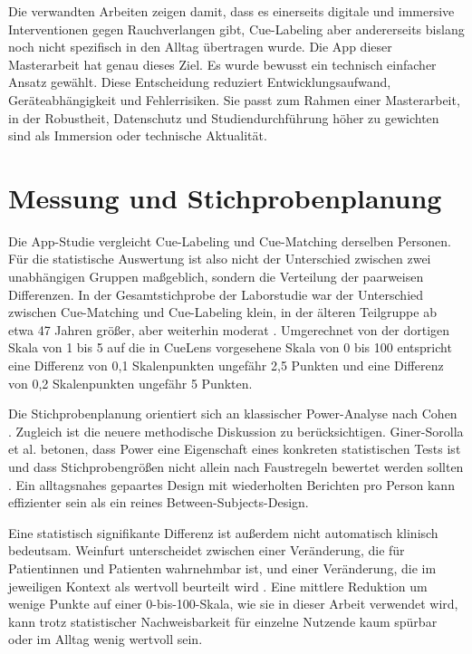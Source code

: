 Die verwandten Arbeiten zeigen damit, dass es einerseits digitale und immersive Interventionen gegen Rauchverlangen gibt, Cue-Labeling aber andererseits bislang noch nicht spezifisch in den Alltag übertragen wurde. Die App dieser Masterarbeit hat genau dieses Ziel. Es wurde bewusst ein technisch einfacher Ansatz gewählt. Diese Entscheidung reduziert Entwicklungsaufwand, Geräteabhängigkeit und Fehlerrisiken. Sie passt zum Rahmen einer Masterarbeit, in der Robustheit, Datenschutz und Studiendurchführung höher zu gewichten sind als Immersion oder technische Aktualität. \\

\section{Messung und Stichprobenplanung}

Die App-Studie vergleicht Cue-Labeling und Cue-Matching derselben Personen. Für die statistische Auswertung ist also nicht der Unterschied zwischen zwei unabhängigen Gruppen maßgeblich, sondern die Verteilung der paarweisen Differenzen. In der Gesamtstichprobe der Laborstudie war der Unterschied zwischen Cue-Matching und Cue-Labeling klein, in der älteren Teilgruppe ab etwa 47 Jahren größer, aber weiterhin moderat \cite{tabibnia_cuelabeling_2026}. Umgerechnet von der dortigen Skala von 1 bis 5 auf die in CueLens vorgesehene Skala von 0 bis 100 entspricht eine Differenz von 0,1 Skalenpunkten ungefähr 2,5 Punkten und eine Differenz von 0,2 Skalenpunkten ungefähr 5 Punkten.

Die Stichprobenplanung orientiert sich an klassischer Power-Analyse nach Cohen \cite{cohen_power_2013}. Zugleich ist die neuere methodische Diskussion zu berücksichtigen. Giner-Sorolla et al. betonen, dass Power eine Eigenschaft eines konkreten statistischen Tests ist und dass Stichprobengrößen nicht allein nach Faustregeln bewertet werden sollten \cite{giner_sorolla_power_2024}. Ein alltagsnahes gepaartes Design mit wiederholten Berichten pro Person kann effizienter sein als ein reines Between-Subjects-Design.

Eine statistisch signifikante Differenz ist außerdem nicht automatisch klinisch bedeutsam. Weinfurt unterscheidet zwischen einer Veränderung, die für Patientinnen und Patienten wahrnehm\-bar ist, und einer Veränderung, die im jeweiligen Kontext als wertvoll beurteilt wird \cite{weinfurt_clinically_meaningful_2019}. Eine mittlere Reduktion um wenige Punkte auf einer 0-bis-100-Skala, wie sie in dieser Arbeit ver\-wendet wird, kann trotz statistischer Nachweisbarkeit für einzelne Nutzende kaum spürbar oder im Alltag wenig wertvoll sein. 

